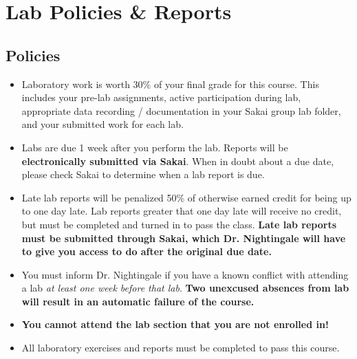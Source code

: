 \section{Lab Policies \& Reports}
\subsection{Policies}
\begin{itemize}
    \item Laboratory work is worth 30\% of your final grade for this course.
        This includes your pre-lab assignments, active participation during
        lab, appropriate data recording / documentation in your Sakai group lab
        folder, and your submitted work for each lab.  
    \item Labs are due 1 week after you perform the lab.
 Reports will be \textbf{electronically
            submitted via Sakai}.  When in doubt about a due date, please check Sakai to determine when a lab
        report is due.
    \item Late lab reports will be penalized 50\% of otherwise earned credit
        for being up to one day late.  Lab reports greater that one day late
        will receive no credit, but must be completed and turned in to pass the
        class.  {\bf Late lab reports must be submitted through Sakai, which
            Dr. Nightingale will have to give you access to do after the original
            due date.}
    \item You must inform Dr. Nightingale if you have a known conflict with
        attending a lab \emph{at least one week before that lab}.  \textbf{Two
            unexcused absences from lab will result in an automatic failure of
            the course.}

    \item \textbf{You cannot attend the lab section that you are not enrolled in!}
    \item All laboratory exercises and reports must be completed to pass this
        course.
\end{itemize}

